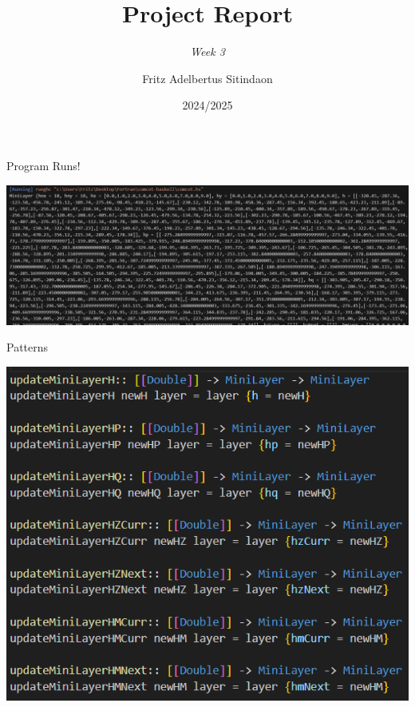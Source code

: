 \documentclass{beamer}
\title{Project Report}
\subtitle{\textit{Week 3}}
\date[]{2024/2025}
\author[Fritz]{Fritz Adelbertus Sitindaon}
\begin{document}
\begin{frame}
\titlepage
\end{frame}



\begin{frame}{Program Runs!}
    \begin{center}
        \includegraphics[scale=0.25]{figure/output.png}
    \end{center}
\end{frame}

\begin{frame}{Patterns}
    \begin{center}
        \includegraphics[scale=0.5]{figure/pattern1.png}
    \end{center}
\end{frame}
\end{document}
